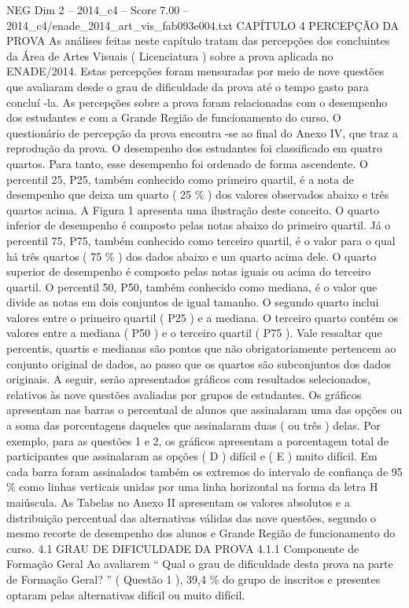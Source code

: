 \begin{textsample}{NEG Dim 2 – 2014\_c4 – Score 7.00 – 2014\_c4/enade\_2014\_art\_vis\_fab093e004.txt}  \label{ex:f2_neg_315}
CAPÍTULO 4 PERCEPÇÃO DA PROVA As análises feitas neste capítulo tratam das percepções dos concluintes da Área de Artes Visuais ( Licenciatura ) sobre a prova aplicada no ENADE/2014.
Estas percepções foram mensuradas por meio de nove questões que avaliaram desde o grau de dificuldade da prova até o tempo gasto para concluí -la.
As percepções sobre a prova foram relacionadas com o desempenho dos estudantes e com a Grande Região de funcionamento do curso.
O questionário de percepção da prova encontra -se ao final do Anexo IV, que traz a reprodução da prova.
O desempenho dos estudantes foi classificado em quatro quartos.
Para tanto, esse desempenho foi ordenado de forma ascendente.
O percentil 25, P25, também conhecido como primeiro quartil, é a nota de desempenho que deixa um quarto ( 25 \% ) dos valores observados abaixo e três quartos acima.
A Figura 1 apresenta uma ilustração deste conceito.
O quarto inferior de desempenho é composto pelas notas abaixo do primeiro quartil.
Já o percentil 75, P75, também conhecido como terceiro quartil, é o valor para o qual há três quartos ( 75 \% ) dos dados abaixo e um quarto acima dele.
O quarto superior de desempenho é composto pelas notas iguais ou acima do terceiro quartil.
O percentil 50, P50, também conhecido como mediana, é o valor que divide as notas em dois conjuntos de igual tamanho.
O segundo quarto inclui valores entre o primeiro quartil ( P25 ) e a mediana.
O terceiro quarto contém os valores entre a mediana ( P50 ) e o terceiro quartil ( P75 ).
Vale ressaltar que percentis, quartis e medianas são pontos que não obrigatoriamente pertencem ao conjunto original de dados, ao passo que os quartos são subconjuntos dos dados originais.
A seguir, serão apresentados gráficos com resultados selecionados, relativos às nove questões avaliadas por grupos de estudantes.
Os gráficos apresentam nas barras o percentual de alunos que assinalaram uma das opções ou a soma das porcentagens daqueles que assinalaram duas ( ou três ) delas.
Por exemplo, para as questões 1 e 2, os gráficos apresentam a porcentagem total de participantes que assinalaram as opções ( D ) difícil e ( E ) muito difícil.
Em cada barra foram assinalados também os extremos do intervalo de confiança de 95 \% como linhas verticais unidas por uma linha horizontal na forma da letra H maiúscula.
As Tabelas no Anexo II apresentam os valores absolutos e a distribuição percentual das alternativas válidas das nove questões, segundo o mesmo recorte de desempenho dos alunos e Grande Região de funcionamento do curso. 4.1 GRAU DE DIFICULDADE DA PROVA 4.1.1 Componente de Formação Geral Ao avaliarem “ Qual o grau de dificuldade desta prova na parte de Formação Geral? ” ( Questão 1 ), 39,4 \% do grupo de inscritos e presentes optaram pelas alternativas difícil ou muito difícil.

\end{textsample}
